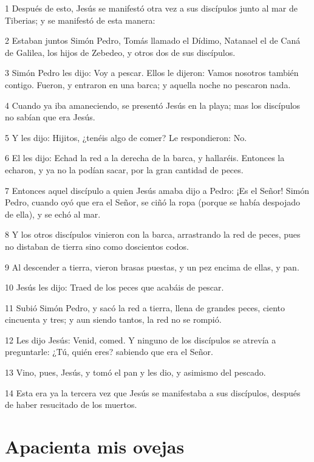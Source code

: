 \par 1 Después de esto, Jesús se manifestó otra vez a sus discípulos junto al mar de Tiberias; y se manifestó de esta manera:
\par 2 Estaban juntos Simón Pedro, Tomás llamado el Dídimo, Natanael el de Caná de Galilea, los hijos de Zebedeo, y otros dos de sus discípulos.
\par 3 Simón Pedro les dijo: Voy a pescar. Ellos le dijeron: Vamos nosotros también contigo. Fueron, y entraron en una barca; y aquella noche no pescaron nada.
\par 4 Cuando ya iba amaneciendo, se presentó Jesús en la playa; mas los discípulos no sabían que era Jesús.
\par 5 Y les dijo: Hijitos, ¿tenéis algo de comer? Le respondieron: No.
\par 6 El les dijo: Echad la red a la derecha de la barca, y hallaréis. Entonces la echaron, y ya no la podían sacar, por la gran cantidad de peces.
\par 7 Entonces aquel discípulo a quien Jesús amaba dijo a Pedro: ¡Es el Señor! Simón Pedro, cuando oyó que era el Señor, se ciñó la ropa (porque se había despojado de ella), y se echó al mar.
\par 8 Y los otros discípulos vinieron con la barca, arrastrando la red de peces, pues no distaban de tierra sino como doscientos codos.
\par 9 Al descender a tierra, vieron brasas puestas, y un pez encima de ellas, y pan.
\par 10 Jesús les dijo: Traed de los peces que acabáis de pescar.
\par 11 Subió Simón Pedro, y sacó la red a tierra, llena de grandes peces, ciento cincuenta y tres; y aun siendo tantos, la red no se rompió.
\par 12 Les dijo Jesús: Venid, comed. Y ninguno de los discípulos se atrevía a preguntarle: ¿Tú, quién eres? sabiendo que era el Señor.
\par 13 Vino, pues, Jesús, y tomó el pan y les dio, y asimismo del pescado.
\par 14 Esta era ya la tercera vez que Jesús se manifestaba a sus discípulos, después de haber resucitado de los muertos.

\section*{Apacienta mis ovejas}

